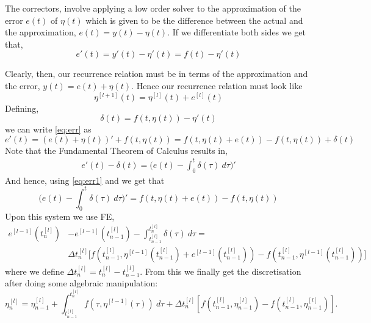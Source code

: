 \documentclass{report}
\begin{document}
The correctors, involve applying a low order solver to the approximation of the error $e(t)$ of $\eta(t)$ which is given to be the difference between the actual and the approximation, $e(t) = y(t) - \eta(t)$. If we differentiate both sides we get that,
\begin{equation}
    e'(t) = y'(t) - \eta'(t) = f(t) - \eta'(t)
    \label{eq:err}
\end{equation}

Clearly, then, our recurrence relation must be in terms of the approximation and the error, $y(t) = e(t) + \eta(t)$. Hence our recurrence relation must look like
\begin{equation*}
    \eta^{[l+1]}(t)= \eta^{[l]}(t) + e^{[l]}(t)
\end{equation*}
Defining, 
\begin{equation}
    \delta(t) = f(t,\eta(t)) - \eta'(t)
    \label{eq:defect}
\end{equation}
we can write \eqref{eq:err} as 
\begin{equation}
    e'(t) =  (e(t) + \eta(t))' + f(t, \eta(t)) = f(t, \eta(t) + e(t)) - f(t, \eta(t)) + \delta(t)
    \label{eq:err1}
\end{equation}
Note that the Fundamental Theorem of Calculus results in,
\begin{align*}
    e'(t) - \delta(t) = \Big(e(t) - \int^t_0 \delta(\tau)\ d\tau \Big)'
\end{align*}
And hence, using \eqref{eq:err1} and we get that 
\begin{equation}
    \Big(e(t) - \int^t_0 \delta(\tau)\ d\tau \Big)' = f(t, \eta(t)+e(t)) - f(t, \eta(t))
    \label{eq:erreq}
\end{equation}
Upon this system we use FE,
\begin{align*}
    e^{[l-1]}(t_n^{[l]}) &- e^{[l-1]}(t_{n-1}^{[l]}) - \int^{t^{[l]}_n}_{t^{[l]}_{n-1}} \delta(\tau)\ d\tau = \\
    &\Delta t^{[l]}_{n} \big[ f(t^{[l]}_{n-1}, \eta^{[l-1]}(t^{[l]}_{n-1})+e^{[l-1]}(t^{[l]}_{n-1})) - f(t^{[l]}_{n-1}, \eta^{[l-1]}(t^{[l]}_{n-1})) \big]
\end{align*}
where we define $\Delta t^{[l]}_n = t^{[l]}_n - t^{[l]}_{n-1}$. From this we finally get the discretisation after doing some algebraic manipulation:
\begin{equation}
    \eta^{[l]}_{n} = \eta^{[l]}_{n-1} + \int^{t^{[l]}_{n}}_{t^{[l]}_{n-1}} f(\tau, \eta^{[l-1]}(\tau))\ d\tau + \Delta t^{[l]}_n [f(t^{[l]}_{n-1}, \eta^{[l]}_{n-1}) - f(t^{[l]}_{n-1}, \eta^{[l]}_{n-1})].
    \label{eq: ridc0}
\end{equation}
\end{document}
